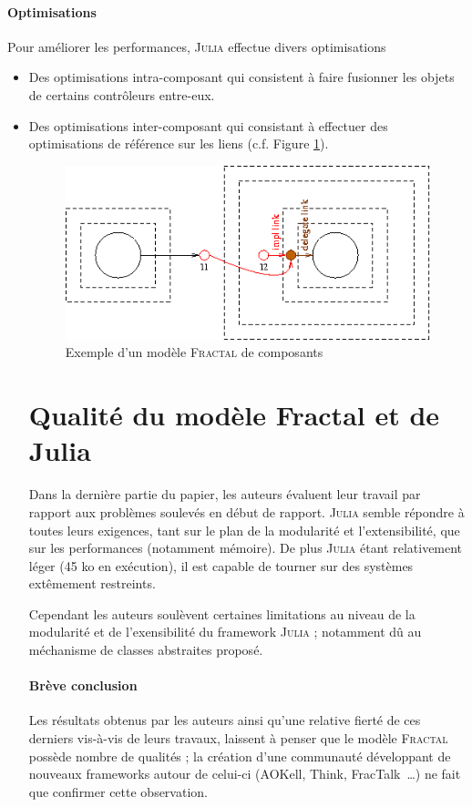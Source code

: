 \documentclass[12pt,a4paper,utf8x]{report}
\newcommand{\versalitas}[1]{{\usefont{T1}{cmr}{bx}{sc}#1}}%
\newcommand\fractal{\textsc{Fractal}}
\newcommand\julia{\textsc{Julia}}
\begin{document}
\paragraph{Optimisations}Pour améliorer les performances, \julia{} effectue divers optimisations
\begin{itemize}
\item Des optimisations intra-composant qui consistent à faire fusionner les objets de certains contrôleurs entre-eux. 
\item Des optimisations inter-composant qui consistant à effectuer des optimisations de référence sur les liens (c.f. Figure \ref{fig:short}).
\begin{figure}[htbp] %
  \center
  \includegraphics[scale=0.5]{img/shortcut}
  \caption{Exemple d'un modèle \fractal{} de composants} %
 \label{fig:short} %
\end{figure} 

\section{Qualité du modèle \versalitas{Fractal} et de \versalitas{Julia}}
Dans la dernière partie du papier, les auteurs évaluent leur travail par rapport aux problèmes soulevés en début de rapport. \julia{} semble répondre à toutes leurs exigences, tant sur le plan de la modularité et l'extensibilité, que sur les performances (notamment mémoire). De plus \julia{} étant relativement léger (45 ko en exécution), il est capable de tourner sur des systèmes extêmement restreints.

Cependant les auteurs soulèvent certaines limitations au niveau de la modularité et de l'exensibilité du framework \julia{} ; notamment dû au méchanisme de classes abstraites proposé.
\paragraph{Brève conclusion} 
Les résultats obtenus par les auteurs ainsi qu'une relative fierté de ces derniers vis-à-vis de leurs travaux, laissent à penser que le modèle \fractal{} possède nombre de qualités ; la création d'une communauté développant de nouveaux frameworks autour de celui-ci (AOKell\cite{AOKell}, Think\cite{Think}, FracTalk\cite{FracTalk}~\dots) ne fait que confirmer cette observation.
  
\end{itemize}

% 
%
% 
% 
% 


\printindex

\appendix


\end{document}
